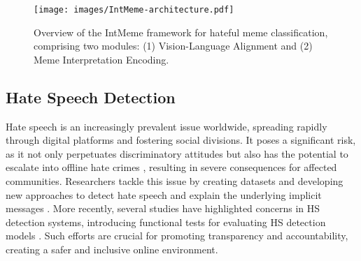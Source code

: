 
\begin{figure*}[t!]
\centering
\texttt{[image: images/IntMeme-architecture.pdf]}
\caption{Overview of the IntMeme framework for hateful meme classification, comprising two modules: (1) Vision-Language Alignment and (2) Meme Interpretation Encoding.}
\label{fig:framework}
\end{figure*}

\label{sec:related}
\subsection{Hate Speech Detection}
Hate speech is an increasingly prevalent issue worldwide, spreading rapidly through digital platforms and fostering social divisions. It poses a significant risk, as it not only perpetuates discriminatory attitudes but also has the potential to escalate into offline hate crimes \cite{lupu2023offline,muller2021fanning,muller2023hashtag}, resulting in severe consequences for affected communities. Researchers tackle this issue by creating datasets and developing new approaches to detect hate speech \cite{davidson2017automated,founta2018large,yoder2022hate} and explain the underlying implicit messages \cite{sap2019social,elsherief2021latent}. More recently, several studies have highlighted concerns in HS detection systems, introducing functional tests for evaluating HS detection models \cite{ng2024sghatecheck,rottger2020hatecheck,rottger2022multilingual}. Such efforts are crucial for promoting transparency and accountability, creating a safer and inclusive online environment.

